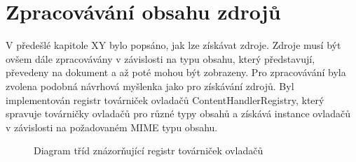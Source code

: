 \section{Zpracovávání obsahu zdrojů}
\label{Chapter.Implementation.ContentHandling}

V předešlé kapitole XY bylo popsáno, jak lze získávat zdroje. Zdroje musí být ovšem dále zpracovávány v závislosti na typu obsahu, který představují, převedeny na dokument a až poté mohou být zobrazeny. Pro zpracovávání byla zvolena podobná návrhová myšlenka jako pro získávání zdrojů. Byl implementován registr továrniček ovladačů ContentHandlerRegistry, který spravuje továrničky ovladačů pro různé typy obsahů a získává instance ovladačů v závislosti na požadovaném MIME typu obsahu. 

\begin{figure}[H]
  \begin{center}
    \caption{Diagram tříd znázorňující registr továrniček ovladačů}
    \label{Figure.ContentHandlerRegistry}
  \end{center}
\end{figure}

